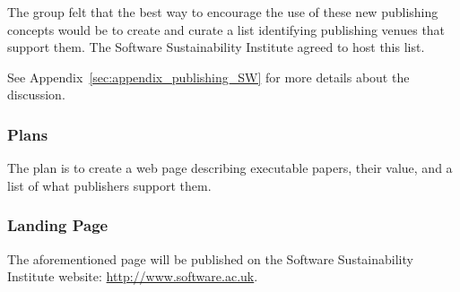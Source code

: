 The group felt that the best way to encourage the use of these new publishing
concepts would be to create and curate a list identifying publishing venues
that support them. The Software Sustainability Institute agreed to host this list.

See Appendix~\ref{sec:appendix_publishing_SW} for more details about the
discussion.

\subsubsection{Plans}

The plan is to create a web page describing executable papers, their value, and
a list of what publishers support them.

\subsubsection{Landing Page}

The aforementioned page will be published on the Software Sustainability Institute website: \url{http://www.software.ac.uk}.
